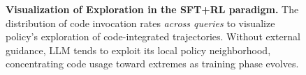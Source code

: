 
\begin{figure}[t]
    \centering %
    \vspace{-0.2cm}
    \caption{\small \textbf{Visualization of Exploration in the SFT+RL paradigm.} \small The distribution of code invocation rates \emph{across queries} to visualize policy's exploration of code-integrated trajectories. Without external guidance, LLM tends to exploit its local policy neighborhood, concentrating code usage toward extremes as training phase evolves. } \vspace{-0.2cm}
    \label{fig_visualize_explore} 
\end{figure}